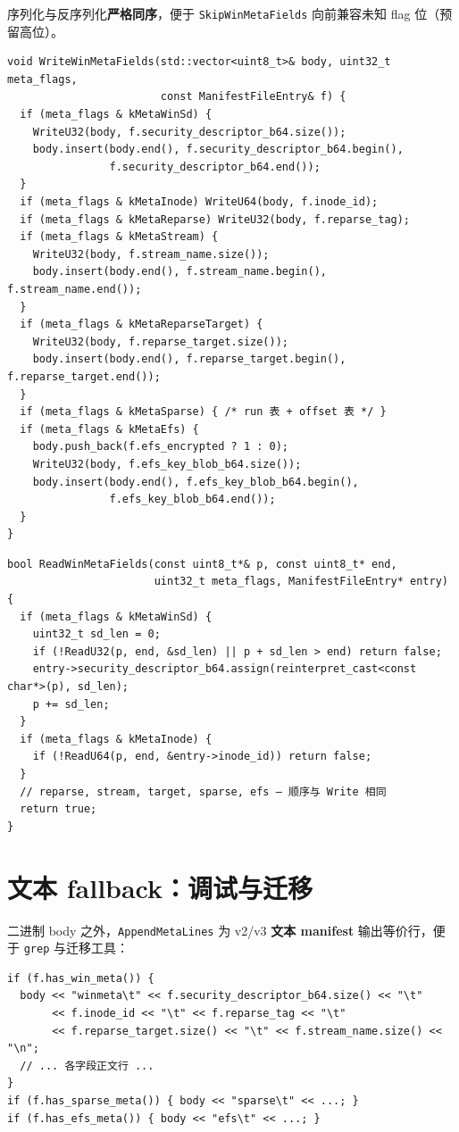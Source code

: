 序列化与反序列化\textbf{严格同序}，便于 \texttt{SkipWinMetaFields} 向前兼容未知 flag 位（预留高位）。

\begin{lstlisting}[caption={WriteWinMetaFields 完整顺序 (manifest.cc)}]
void WriteWinMetaFields(std::vector<uint8_t>& body, uint32_t meta_flags,
                        const ManifestFileEntry& f) {
  if (meta_flags & kMetaWinSd) {
    WriteU32(body, f.security_descriptor_b64.size());
    body.insert(body.end(), f.security_descriptor_b64.begin(),
                f.security_descriptor_b64.end());
  }
  if (meta_flags & kMetaInode) WriteU64(body, f.inode_id);
  if (meta_flags & kMetaReparse) WriteU32(body, f.reparse_tag);
  if (meta_flags & kMetaStream) {
    WriteU32(body, f.stream_name.size());
    body.insert(body.end(), f.stream_name.begin(), f.stream_name.end());
  }
  if (meta_flags & kMetaReparseTarget) {
    WriteU32(body, f.reparse_target.size());
    body.insert(body.end(), f.reparse_target.begin(), f.reparse_target.end());
  }
  if (meta_flags & kMetaSparse) { /* run 表 + offset 表 */ }
  if (meta_flags & kMetaEfs) {
    body.push_back(f.efs_encrypted ? 1 : 0);
    WriteU32(body, f.efs_key_blob_b64.size());
    body.insert(body.end(), f.efs_key_blob_b64.begin(),
                f.efs_key_blob_b64.end());
  }
}
\end{lstlisting}

\begin{lstlisting}[caption={ReadWinMetaFields 对称读取 (manifest.cc)}]
bool ReadWinMetaFields(const uint8_t*& p, const uint8_t* end,
                       uint32_t meta_flags, ManifestFileEntry* entry) {
  if (meta_flags & kMetaWinSd) {
    uint32_t sd_len = 0;
    if (!ReadU32(p, end, &sd_len) || p + sd_len > end) return false;
    entry->security_descriptor_b64.assign(reinterpret_cast<const char*>(p), sd_len);
    p += sd_len;
  }
  if (meta_flags & kMetaInode) {
    if (!ReadU64(p, end, &entry->inode_id)) return false;
  }
  // reparse, stream, target, sparse, efs — 顺序与 Write 相同
  return true;
}
\end{lstlisting}

\section{文本 fallback：调试与迁移}

二进制 body 之外，\texttt{AppendMetaLines} 为 v2/v3 \textbf{文本 manifest} 输出等价行，便于 \texttt{grep} 与迁移工具：

\begin{lstlisting}[caption={文本 winmeta/sparse/efs 行 (manifest.cc)}]
if (f.has_win_meta()) {
  body << "winmeta\t" << f.security_descriptor_b64.size() << "\t"
       << f.inode_id << "\t" << f.reparse_tag << "\t"
       << f.reparse_target.size() << "\t" << f.stream_name.size() << "\n";
  // ... 各字段正文行 ...
}
if (f.has_sparse_meta()) { body << "sparse\t" << ...; }
if (f.has_efs_meta()) { body << "efs\t" << ...; }
\end{lstlisting}


